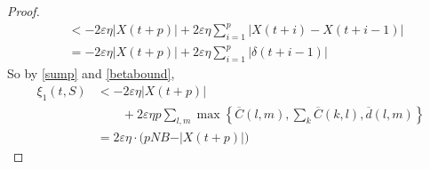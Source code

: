 \begin{proof}
\begin{align}
&< -2\varepsilon \eta   \vert X(t + p) \vert  + 2\varepsilon \eta\sum_{i=1}^{p} \vert  X(t + i) - X(t + i - 1)   \vert  \\ 
&= -2\varepsilon \eta   \vert X(t + p) \vert + 2\varepsilon \eta\sum_{i=1}^{p} \vert \delta(t + i -1) \vert 
\label{sump}
\end{align}
So by \eqref{sump} and \eqref{betabound}, 
\begin{align} \nonumber
\xi_1(t, S) &< -2\varepsilon \eta  \vert X(t + p) \vert \\ \nonumber
& \qquad + 2\varepsilon \eta  p \sum_{l,m} \max\left\{ \overline{C}(l,m),\sum_{k}\overline{C}(k,l),\overline d(l,m) \right\} \\ 
& = 2 \varepsilon \eta \cdot  \Big(pNB -  \vert X(t + p) \vert\Big) \label{xi1_bound}
\end{align}
%
%
%

\end{proof}
